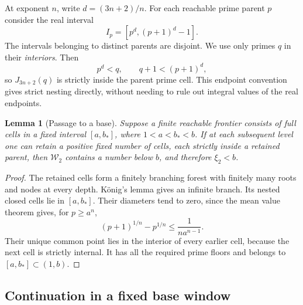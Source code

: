 \documentclass[11pt,a4paper]{article}
\newtheorem{lemma}[theorem]{Lemma}\newtheorem{proposition}[theorem]{Proposition}
\theoremstyle{definition}\newtheorem{definition}[theorem]{Definition}
\theoremstyle{remark}\newtheorem{remark}[theorem]{Remark}
\begin{document}
At exponent $n$, write $d=(3n+2)/n$. For each reachable prime parent
$p$ consider the real interval
\begin{equation}\label{R05:eq:childinterval}
 I_p=[p^d,(p+1)^d-1].
\end{equation}
The intervals belonging to distinct parents are disjoint.
We use only primes $q$ in their \emph{interiors}. Then
\[
 p^d<q,\qquad q+1<(p+1)^d,
\]
so $J_{3n+2}(q)$ is strictly inside the parent prime cell.
This endpoint convention gives strict nesting directly, without
needing to rule out integral values of the real endpoints.

\begin{lemma}[Passage to a base]\label{R05:lem:branch}
Suppose a finite reachable frontier consists of full cells in a
fixed interval $[a,b_*]$, where $1<a<b_*<b$. If at each subsequent
level one can retain a positive fixed number of cells, each strictly
inside a retained parent, then $\mathcal W_2$ contains a number below
$b$, and therefore $\xi_2<b$.
\end{lemma}
\begin{proof}
The retained cells form a finitely branching forest with finitely
many roots and nodes at every depth. K\"onig's lemma gives an infinite
branch. Its nested closed cells lie in $[a,b_*]$. Their diameters tend
to zero, since the mean value theorem gives, for $p\ge a^n$,
\[
 (p+1)^{1/n}-p^{1/n}\le\frac1{n a^{n-1}}.
\]
Their unique common point lies in the interior of every earlier
cell, because the next cell is strictly internal. It has all the
required prime floors and belongs to $[a,b_*]\subset(1,b)$.
\end{proof}

\subsection{Continuation in a fixed base window}
\label{R05:sec:fixed}
\end{document}
